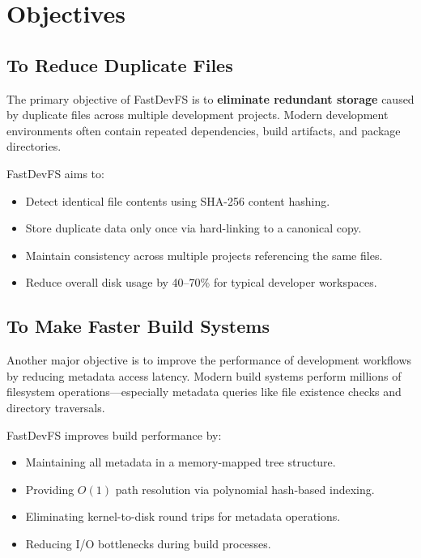 \documentclass[12pt, a4paper]{article}
\begin{document}
\section{Objectives}

\subsection{To Reduce Duplicate Files}

The primary objective of FastDevFS is to \textbf{eliminate redundant storage} caused by duplicate files across multiple development projects. Modern development environments often contain repeated dependencies, build artifacts, and package directories.

FastDevFS aims to:
\begin{itemize}
  \item Detect identical file contents using SHA-256 content hashing.
  \item Store duplicate data only once via hard-linking to a canonical copy.
  \item Maintain consistency across multiple projects referencing the same files.
  \item Reduce overall disk usage by 40--70\% for typical developer workspaces.
\end{itemize}

\subsection{To Make Faster Build Systems}

Another major objective is to improve the performance of development workflows by reducing metadata access latency. Modern build systems perform millions of filesystem operations---especially metadata queries like file existence checks and directory traversals.

FastDevFS improves build performance by:
\begin{itemize}
  \item Maintaining all metadata in a memory-mapped tree structure.
  \item Providing $O(1)$ path resolution via polynomial hash-based indexing.
  \item Eliminating kernel-to-disk round trips for metadata operations.
  \item Reducing I/O bottlenecks during build processes.
\end{itemize}
\end{document}
